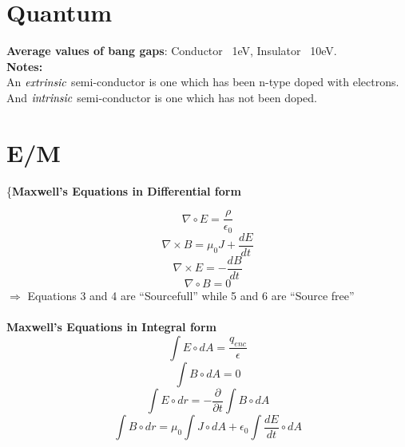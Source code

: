 \documentclass{article}
\begin{document}
{\section{Quantum}
{\bf{Average values of bang gaps}}: Conductor ~1eV, Insulator ~10eV.\\






{\bf{Notes:}}\\
\hspace*{.5in}An $\emph{extrinsic}$ semi-conductor is one which has been n-type doped with electrons.\\
\hspace*{.5in}And $\emph{intrinsic}$ semi-conductor is one which has not been doped.




\section{E/M}
\{\bf{Maxwell's Equations in Differential form}} 


\begin{equation}\nabla \circ E=\frac{\rho}{\epsilon_0}\end{equation}
\begin{equation}\nabla \times B=\mu_0 J + \frac{dE}{dt}\end{equation}
\begin{equation}\nabla \times E=-\frac{dB}{dt}\end{equation}
\begin{equation}\nabla \circ B=0\end{equation}
$\Rightarrow$ Equations 3 and 4 are ``Sourcefull'' while 5 and 6 are ``Source free''\\
\\
{\bf{Maxwell's Equations in Integral form}}
\begin{equation}\int E \circ dA=\frac{q_{enc}}{\epsilon}\end{equation}
\begin{equation}\int B \circ dA=0\end{equation}
\begin{equation}\int E \circ dr=-\frac{\partial}{\partial t}\int B \circ dA \end{equation}
\begin{equation}\int B \circ dr=\mu_0 \int J \circ dA + \epsilon_0 \int \frac{dE}{dt}\circ dA\end{equation}
\end{document}
